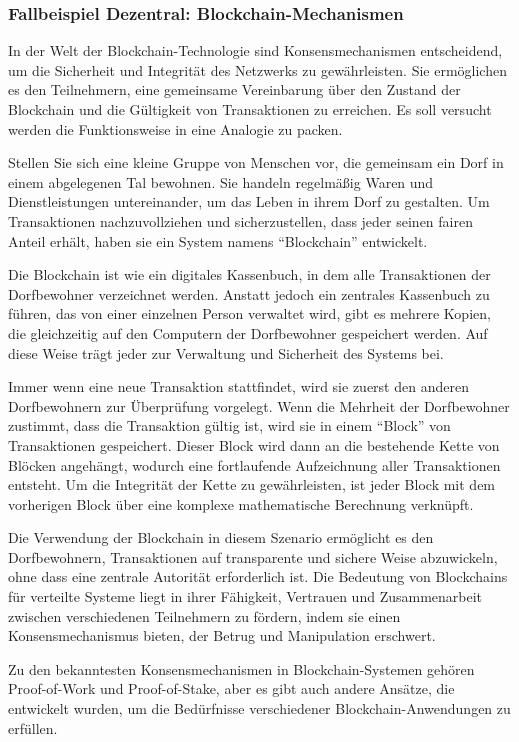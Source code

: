 \documentclass[../vs-script-first-v01.tex]{subfiles}
\begin{document}
\subsubsection{Fallbeispiel Dezentral: Blockchain-Mechanismen}

In der Welt der Blockchain-Technologie sind Konsensmechanismen entscheidend, um die Sicherheit und Integrität des Netzwerks zu gewährleisten. Sie ermöglichen es den Teilnehmern, eine gemeinsame Vereinbarung über den Zustand der Blockchain und die Gültigkeit von Transaktionen zu erreichen. Es soll versucht werden die Funktionsweise in eine Analogie zu packen. 

Stellen Sie sich eine kleine Gruppe von Menschen vor, die gemeinsam ein Dorf in einem abgelegenen Tal bewohnen. Sie handeln regelmäßig Waren und Dienstleistungen untereinander, um das Leben in ihrem Dorf zu gestalten. Um Transaktionen nachzuvollziehen und sicherzustellen, dass jeder seinen fairen Anteil erhält, haben sie ein System namens \enquote{Blockchain} entwickelt.

Die Blockchain ist wie ein digitales Kassenbuch, in dem alle Transaktionen der Dorfbewohner verzeichnet werden. Anstatt jedoch ein zentrales Kassenbuch zu führen, das von einer einzelnen Person verwaltet wird, gibt es mehrere Kopien, die gleichzeitig auf den Computern der Dorfbewohner gespeichert werden. Auf diese Weise trägt jeder zur Verwaltung und Sicherheit des Systems bei.

Immer wenn eine neue Transaktion stattfindet, wird sie zuerst den anderen Dorfbewohnern zur Überprüfung vorgelegt. Wenn die Mehrheit der Dorfbewohner zustimmt, dass die Transaktion gültig ist, wird sie in einem \enquote{Block} von Transaktionen gespeichert. Dieser Block wird dann an die bestehende Kette von Blöcken angehängt, wodurch eine fortlaufende Aufzeichnung aller Transaktionen entsteht. Um die Integrität der Kette zu gewährleisten, ist jeder Block mit dem vorherigen Block über eine komplexe mathematische Berechnung verknüpft.

Die Verwendung der Blockchain in diesem Szenario ermöglicht es den Dorfbewohnern, Transaktionen auf transparente und sichere Weise abzuwickeln, ohne dass eine zentrale Autorität erforderlich ist. Die Bedeutung von Blockchains für verteilte Systeme liegt in ihrer Fähigkeit, Vertrauen und Zusammenarbeit zwischen verschiedenen Teilnehmern zu fördern, indem sie einen Konsensmechanismus bieten, der Betrug und Manipulation erschwert.

Zu den bekanntesten Konsensmechanismen in Blockchain-Systemen gehören Proof-of-Work und Proof-of-Stake, aber es gibt auch andere Ansätze, die entwickelt wurden, um die Bedürfnisse verschiedener Blockchain-Anwendungen zu erfüllen.
\end{document}
